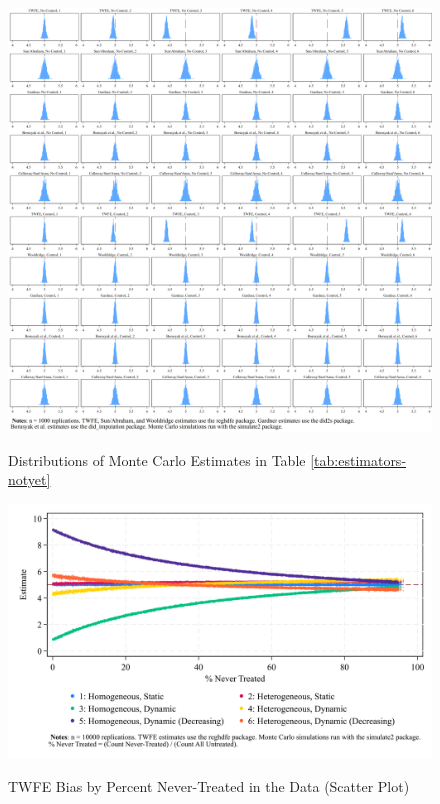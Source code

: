 \documentclass[12pt]{article}
\begin{document}
\begin{figure}[H]
    \centering
    \caption{Distributions of Monte Carlo Estimates in Table \ref{tab:estimators-notyet}}
    \includegraphics[width=6in]{Figures/Histograms of Monte Carlo Estimates 2.png}
    \label{fig:hist2}
\end{figure}

\begin{figure}
    \centering
    \caption{TWFE Bias by Percent Never-Treated in the Data (Scatter Plot)}
    \includegraphics[width=6in]{Figures/TWFE Bias by Percent Never Treated Scatter.png}
    \label{fig:scatter-nevertreat}
\end{figure}
\end{document}
